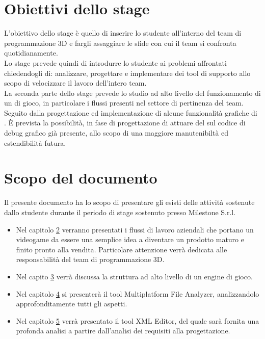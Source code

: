 \section{Obiettivi dello stage}

L'obiettivo dello stage è quello di inserire lo studente all'interno del team di programmazione 3D e fargli assaggiare le sfide con cui il team si confronta quotidianamente.\\

Lo stage prevede quindi di introdurre lo studente ai problemi affrontati chiedendogli di: analizzare, progettare e implementare dei tool di supporto allo scopo di velocizzare il lavoro dell'intero team.\\

La seconda parte dello stage prevede lo studio ad alto livello del funzionamento di un  di gioco, in particolare i flussi presenti nel settore di pertinenza del team. Seguito dalla progettazione ed implementazione di alcune funzionalità grafiche di . È prevista la possibilità, in fase di progettazione di attuare del  sul codice di debug grafico già presente, allo scopo di una maggiore manutenibiltà ed estendibilità futura.

\section{Scopo del documento}

Il presente documento ha lo scopo di presentare gli esisti delle attività sostenute dallo studente durante il periodo di stage sostenuto presso Milestone S.r.l.\\

\begin{itemize}
	\item Nel capitolo \hyperref[cap:milestone]{2} verranno presentati i flussi di lavoro aziendali che portano un videogame da essere una semplice idea a diventare un prodotto maturo e finito pronto alla vendita. Particolare attenzione verrà dedicata alle responsabilità del team di programmazione 3D.
	
	\item Nel capito \hyperref[cap:engine-di-gioco]{3} verrà discussa la struttura ad alto livello di un engine di gioco.
	
	\item Nel capitolo \hyperref[cap:multiplatform-file-analyzer]{4} si presenterà il tool Multiplatform File Analyzer, analizzandolo approfonditamente tutti gli aspetti.
	
	\item Nel capitolo \hyperref[cap:xml-editor]{5} verrà presentato il tool XML Editor, del quale sarà fornita una profonda analisi a partire dall'analisi dei requisiti alla progettazione.
\end{itemize}

